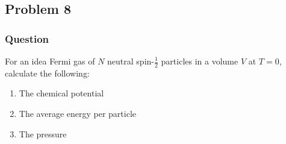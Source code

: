 \subsection{Problem 8}
\subsubsection{Question}

For an idea Fermi gas of $N$ neutral spin-$\frac 12$ particles in a volume
$V$ at $T = 0$, calculate the following:
\begin{enumerate}
	\item The chemical potential
	\item The average energy per particle
	\item The pressure
\end{enumerate}

